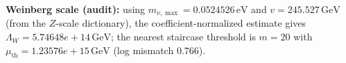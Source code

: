 \textbf{Weinberg scale (audit):} using $m_{\nu,\max}=0.0524526\,\mathrm{eV}$ and $v=245.527\,\mathrm{GeV}$ (from the $Z$-scale dictionary), the coefficient-normalized estimate gives $\Lambda_W=5.74648e+14\,\mathrm{GeV}$; the nearest staircase threshold is $m=20$ with $\mu_\mathrm{th}=1.23576e+15\,\mathrm{GeV}$ (log mismatch 0.766).